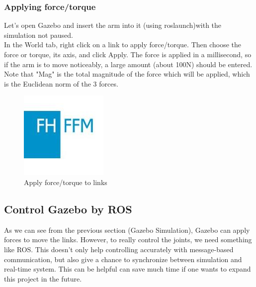 \documentclass[pdftex,12pt,a4paper]{article}
\begin{document}
  \subsubsection{Applying force/torque}
  Let's open Gazebo and insert the arm into it (using roslaunch)with the simulation not paused.\\
  In the World tab, right click on a link to apply force/torque. Then choose the force or torque, its axis, and click Apply. The force is applied in a millisecond, so if the arm is to move noticeably, a large amount (about 100N) should be entered.\\
  Note that "Mag" is the total magnitude of the force which will be applied, which is the Euclidean norm of the 3 forces.
  \begin{figure}[h]
      \centering
      \includegraphics[width=0.6\linewidth]{image/FH-Frankfurt.jpg}
      \caption{Apply force/torque to links}
      \label{fig:arm_gazebo_applyForce}
  \end{figure}
  
  \newpage
  \subsection{Control Gazebo by ROS}
  As we can see from the previous section (Gazebo Simulation), Gazebo can apply forces to move the links. However, to really control the joints, we need something like ROS. This doesn't only help controlling accurately with message-based communication, but also give a chance to synchronize between simulation and real-time system. This can be helpful can save much time if one wants to expand this project in the future.
\end{document}
